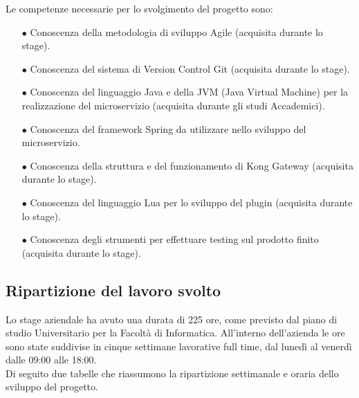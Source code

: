 Le competenze necessarie per lo svolgimento del progetto sono:
\begin{itemize}
	\item[$\bullet$]Conoscenza della metodologia di sviluppo Agile (acquisita durante lo stage).
	\item[$\bullet$]Conoscenza del sistema di Version Control Git (acquisita durante lo stage).
	\item[$\bullet$]Conoscenza del linguaggio Java e della JVM (Java Virtual Machine) per la realizzazione del microservizio (acquisita durante gli studi Accademici).
	\item[$\bullet$]Conoscenza del framework Spring da utilizzare nello sviluppo del microservizio.
	\item[$\bullet$]Conoscenza della struttura e del funzionamento di Kong Gateway (acquisita durante lo stage).
	\item[$\bullet$]Conoscenza del linguaggio Lua per lo sviluppo del plugin (acquisita durante lo stage).
	\item[$\bullet$]Conoscenza degli strumenti per effettuare testing sul prodotto finito (acquisita durante lo stage).
\end{itemize}

\subsection{Ripartizione del lavoro svolto}\label{sec:ripartizionelavoro}
Lo stage aziendale ha avuto una durata di 225 ore, come previsto dal piano di studio Universitario per la Facoltà di Informatica. All'interno dell'azienda le ore sono state suddivise in cinque settimane lavorative full time, dal lunedì al venerdì dalle 09:00 alle 18:00.\\
Di seguito due tabelle che riassumono la ripartizione settimanale e oraria dello sviluppo del progetto.\\

